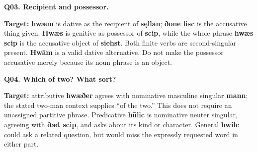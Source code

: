\par\begin{minipage}{\linewidth}\raggedright
\textbf{Q03. Recipient and possessor.}



\textbf{Target:} \textbf{hwǣm} is dative as the recipient of \textbf{sęllan}; \textbf{ðone fisc} is the accusative thing given. \textbf{Hwæs} is genitive as possessor of \textbf{scip}, while the whole phrase \textbf{hwæs scip} is the accusative object of \textbf{siehst}. Both finite verbs are second-singular present. \textbf{Hwām} is a valid dative alternative. Do not make the possessor accusative merely because its noun phrase is an object.

\end{minipage}\par\addvspace{4pt}

\par\begin{minipage}{\linewidth}\raggedright
\textbf{Q04. Which of two? What sort?}



\textbf{Target:} attributive \textbf{hwæðer} agrees with nominative masculine singular \textbf{mann}; the stated two-man context supplies “of the two.” This does not require an unassigned partitive phrase. Predicative \textbf{hūlic} is nominative neuter singular, agreeing with \textbf{ðæt scip}, and asks about its kind or character. General \textbf{hwilc} could ask a related question, but would miss the expressly requested word in either part.

\end{minipage}\par\addvspace{4pt}


